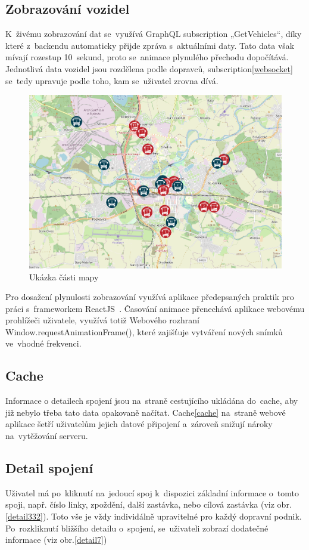 \subsection{Zobrazování vozidel}
K~živému zobrazování dat se~využívá GraphQL subscription „GetVehicles“, díky které z~backendu automaticky přijde zpráva s~aktuálními daty. Tato data však mívají rozestup 10~sekund, proto se~animace plynulého přechodu dopočítává. Jednotlivá data vozidel jsou rozdělena podle dopravců, subscription\ref{websocket} se~tedy upravuje podle toho, kam se~uživatel zrovna dívá.
\begin{figure}[H]
    \centering
    \includegraphics[width=1\textwidth]{images/Screenshot from 2023-03-18 20-15-00.png}
    \caption{Ukázka části mapy}
    \label{mapa}
\end{figure}

Pro dosažení plynulosti zobrazování využívá aplikace předepsaných praktik pro práci s~frameworkem ReactJS~\cite{reactlist}. Časování animace přenechává aplikace webovému prohlížeči uživatele, využívá totiž Webového rozhraní Window.requestAnimationFrame()\cite{animationframe}, které zajišťuje vytváření nových snímků ve~vhodné frekvenci.
\subsection{Cache}
Informace o detailech spojení jsou na~straně cestujícího ukládána do~cache, aby již nebylo třeba tato data opakovaně načítat. Cache\ref{cache} na~straně webové aplikace šetří uživatelům jejich datové připojení a~zároveň snižují nároky na~vytěžování serveru.

\subsection{Detail spojení}
Uživatel má po~kliknutí na~jedoucí spoj k~dispozici základní informace o~tomto spoji, např. číslo linky, zpoždění, další zastávka, nebo cílová zastávka (viz obr.\ref{detail332}). Toto vše je vždy individálně upravitelné pro každý dopravní podnik. Po~rozkliknutí bližšího detailu o~spojení, se~uživateli zobrazí dodatečné informace (viz obr.\ref{detail7})

